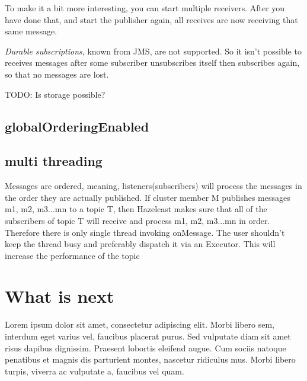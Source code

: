 To make it a bit more interesting, you can start multiple receivers. After you have done that, and start the publisher again, all receives are now receiving that same message.

\emph{Durable subscriptions}, known from JMS, are not supported. So it isn't possible to receives messages after some subscriber unsubscribes itself then subscribes again, so that no messages are lost.

 TODO: Is storage possible? 

\subsection{globalOrderingEnabled}

\subsection{multi threading}
Messages are ordered, meaning, listeners(subscribers) will process the messages in the order they are actually published. If cluster member M publishes messages m1, m2, m3...mn to a topic T, then Hazelcast makes sure that all of the subscribers of topic T will receive and process m1, m2, m3...mn in order. Therefore there is only single thread invoking onMessage. The user shouldn't keep the thread busy and preferably dispatch it via an Executor. This will increase the performance of the topic

\section{What is next}
Lorem ipsum dolor sit amet, consectetur adipiscing elit. Morbi libero sem,
interdum eget varius vel, faucibus placerat purus. Sed vulputate diam sit amet
risus dapibus dignissim. Praesent lobortis eleifend augue. Cum sociis natoque
penatibus et magnis dis parturient montes, nascetur ridiculus mus. Morbi libero
turpis, viverra ac vulputate a, faucibus vel quam.
